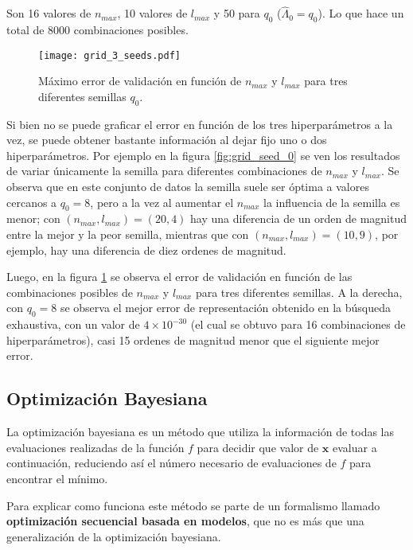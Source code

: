 Son 16 valores de $n_{max}$, 10 valores de $l_{max}$ y 50 para $q_0$ ($\hat{\Lambda}_0 = q_0$). Lo que hace un total de 8000 combinaciones posibles.



\begin{figure}[h!]
\centering
\texttt{[image: grid\_3\_seeds.pdf]}
\caption{Máximo error de validación en función de $n_{max}$ y $l_{max}$ para tres diferentes semillas $q_0$. }
\label{fig:grid_3_seeds}
\end{figure}

Si bien no se puede graficar el error en función de los tres hiperparámetros a la vez, se puede obtener bastante información al dejar fijo uno o dos hiperparámetros. Por ejemplo en la figura \ref{fig:grid_seed_0} se ven los resultados de variar únicamente la semilla para diferentes combinaciones de $n_{max}$ y $l_{max}$. Se observa que en este conjunto de datos la semilla suele ser óptima a valores cercanos a $q_0 = 8$, pero a la vez al aumentar el $n_{max}$ la influencia de la semilla es menor; con $(n_{max}, l_{max})=(20, 4)$ hay una diferencia de un orden de magnitud entre la mejor y la peor semilla, mientras que con $(n_{max}, l_{max})=(10, 9)$, por ejemplo, hay una diferencia de diez ordenes de magnitud.

Luego, en la figura \ref{fig:grid_3_seeds} se observa el error de validación en función de las combinaciones posibles de  $n_{max}$ y $l_{max}$ para tres diferentes semillas. A la derecha, con $q_0=8$ se observa el mejor error de representación obtenido en la búsqueda exhaustiva, con un valor de $4\times10^{-30}$ (el cual se obtuvo para 16 combinaciones de hiperparámetros), casi 15 ordenes de magnitud menor que el siguiente mejor error.


\subsection{Optimización Bayesiana}


La optimización bayesiana es un método que utiliza la información de todas las evaluaciones realizadas de la función $f$ para decidir que valor de $\textbf{x}$ evaluar a continuación, reduciendo así el número necesario de evaluaciones de $f$ para encontrar el mínimo.

Para explicar como funciona este método se parte de un formalismo llamado \textbf{optimización secuencial basada en modelos}, que no es más que una generalización de la optimización bayesiana.


